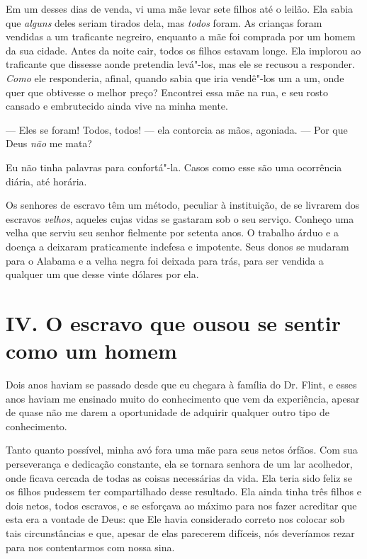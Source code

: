 Em um desses dias de venda, vi uma mãe
levar sete filhos até o leilão. Ela sabia que \emph{alguns} deles seriam
tirados dela, mas \emph{todos} foram. As crianças foram vendidas a um
traficante negreiro, enquanto a mãe foi comprada por um homem da sua
cidade. Antes da noite cair, todos os filhos estavam longe. Ela implorou
ao traficante que dissesse aonde pretendia levá"-los, mas ele se recusou
a responder. \emph{Como} ele responderia, afinal, quando sabia que iria
vendê"-los um a um, onde quer que obtivesse o melhor preço? Encontrei
essa mãe na rua, e seu rosto cansado e embrutecido ainda vive na minha
mente.

--- Eles se foram! Todos, todos! --- ela contorcia as mãos, agoniada.
--- Por que Deus \emph{não} me mata?

Eu não tinha palavras para confortá"-la. Casos como esse são uma
ocorrência diária, até horária.

Os senhores de escravo têm um método,
peculiar à instituição, de se livrarem dos escravos \emph{velhos},
aqueles cujas vidas se gastaram sob o seu serviço. Conheço uma velha que
serviu seu senhor fielmente por setenta anos. O trabalho árduo e a
doença a deixaram praticamente indefesa e impotente. Seus donos se
mudaram para o Alabama e a velha negra foi deixada para trás, para ser
vendida a qualquer um que desse vinte dólares por ela.

\chapter{IV. O escravo que ousou se sentir como um
homem}

Dois anos haviam se passado desde que
eu chegara à família do Dr. Flint, e esses anos haviam me ensinado muito
do conhecimento que vem da experiência, apesar de quase não me darem a
oportunidade de adquirir qualquer outro tipo de conhecimento.

Tanto quanto possível, minha avó fora
uma mãe para seus netos órfãos. Com sua perseverança e dedicação
constante, ela se tornara senhora de um lar acolhedor, onde ficava
cercada de todas as coisas necessárias da vida. Ela teria sido feliz se
os filhos pudessem ter compartilhado desse resultado. Ela ainda tinha
três filhos e dois netos, todos escravos, e se esforçava ao máximo para
nos fazer acreditar que esta era a vontade de Deus: que Ele havia
considerado correto nos colocar sob tais circunstâncias e que, apesar de
elas parecerem difíceis, nós deveríamos rezar para nos contentarmos com
nossa sina.

